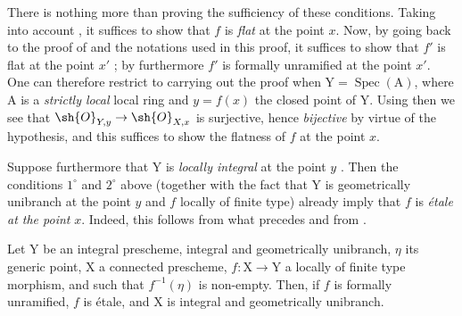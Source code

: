 There is nothing more than proving the sufficiency of these conditions.
Taking into account , it suffices to show that $f$ is \emph{flat} at the point $x$.
Now, by going back to the proof of  and the notations used in this proof, it suffices to show that $f'$ is flat at the point $x'$ ; by  furthermore $f'$ is formally unramified at the point $x'$.
One can therefore restrict to carrying out the proof when $\mathrm{Y}=\operatorname{Spec}(\mathrm{A})$, where $\mathrm{A}$ is a \emph{strictly local} local ring and $y=f(x)$ the closed point of $\mathrm{Y}$.
Using then  we see that $\sh{O}_{Y,y}\to\sh{O}_{X,x}$ is surjective, hence \emph{bijective} by virtue of the hypothesis, and this suffices to show the flatness of $f$ at the point $x$.

Suppose furthermore that $\mathrm{Y}$ is \emph{locally integral} at the point $y$ .
Then the conditions $1^{\circ}$ and $2^{\circ}$ above (together with the fact that $\mathrm{Y}$ is geometrically unibranch at the point $y$ and $f$ locally of finite type) already imply that $f$ is \emph{\'etale at the point} $x$.
Indeed, this follows from what precedes and from .

\begin{corollary}[18.10.3]
\label{IV.18.10.3}
Let $\mathrm{Y}$ be an integral prescheme, integral and geometrically unibranch, $\eta$ its generic point, $\mathrm{X}$ a connected prescheme, $f:\mathrm{X}\to\mathrm{Y}$ a locally of finite type morphism, and such that $f^{-1}(\eta)$ is non-empty.
Then, if $f$ is formally unramified, $f$ is \'etale, and $\mathrm{X}$ is integral and geometrically unibranch.
\end{corollary}

